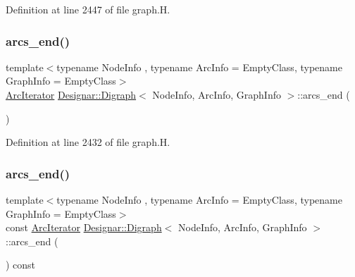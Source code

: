 Definition at line 2447 of file graph.\+H.

\mbox{\label{class_designar_1_1_digraph_af4e39baa2e8370cfda5f61f551b3091f}} 
\subsubsection{\texorpdfstring{arcs\+\_\+end()}{arcs\_end()}\hspace{0.1cm}{\footnotesize\ttfamily [1/4]}}
{\footnotesize\ttfamily template$<$typename Node\+Info , typename Arc\+Info  = Empty\+Class, typename Graph\+Info  = Empty\+Class$>$ \\
\hyperlink{class_designar_1_1_digraph_1_1_arc_iterator}{Arc\+Iterator} \hyperlink{class_designar_1_1_digraph}{Designar\+::\+Digraph}$<$ Node\+Info, Arc\+Info, Graph\+Info $>$\+::arcs\+\_\+end (\begin{DoxyParamCaption}{ }\end{DoxyParamCaption})\hspace{0.3cm}{\ttfamily [inline]}}



Definition at line 2432 of file graph.\+H.

\mbox{\label{class_designar_1_1_digraph_a128df54ce973f5b1f956407a7f565bc3}} 
\subsubsection{\texorpdfstring{arcs\+\_\+end()}{arcs\_end()}\hspace{0.1cm}{\footnotesize\ttfamily [2/4]}}
{\footnotesize\ttfamily template$<$typename Node\+Info , typename Arc\+Info  = Empty\+Class, typename Graph\+Info  = Empty\+Class$>$ \\
const \hyperlink{class_designar_1_1_digraph_1_1_arc_iterator}{Arc\+Iterator} \hyperlink{class_designar_1_1_digraph}{Designar\+::\+Digraph}$<$ Node\+Info, Arc\+Info, Graph\+Info $>$\+::arcs\+\_\+end (\begin{DoxyParamCaption}{ }\end{DoxyParamCaption}) const\hspace{0.3cm}{\ttfamily [inline]}}




